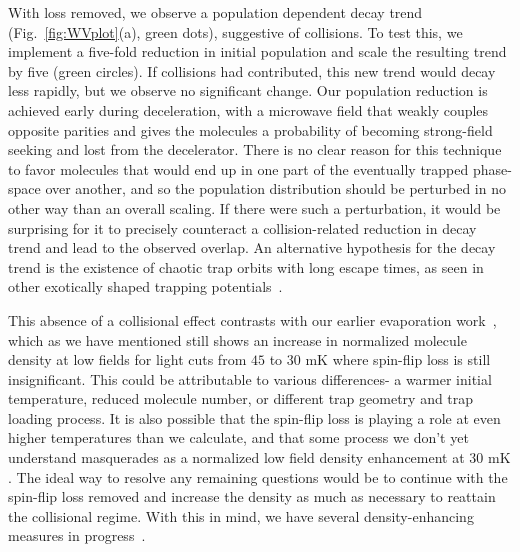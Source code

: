 \documentclass[%
 reprint,
groupedaddress,
 amsmath,amssymb,
 aps,
prl,
]{revtex4-1}
\begin{document}
With loss removed, we observe a population dependent decay trend (Fig.~\ref{fig:WVplot}(a), green dots), suggestive of collisions. To test this, we implement a five-fold reduction in initial population and scale the resulting trend by five (green circles). If collisions had contributed, this new trend would decay less rapidly, but we observe no significant change. Our population reduction is achieved early during deceleration, with a microwave field that weakly couples opposite parities and gives the molecules a probability of becoming strong-field seeking and lost from the decelerator. There is no clear reason for this technique to favor molecules that would end up in one part of the eventually trapped phase-space over another, and so the population distribution should be perturbed in no other way than an overall scaling. If there were such a perturbation, it would be surprising for it to precisely counteract a collision-related reduction in decay trend and lead to the observed overlap. An alternative hypothesis for the decay trend is the existence of chaotic trap orbits with long escape times, as seen in other exotically shaped trapping potentials~\cite{Gonzalez-Ferez2014}.

This absence of a collisional effect contrasts with our earlier evaporation work~\cite{Stuhl2012evap}, which as we have mentioned still shows an increase in normalized molecule density at low fields for light cuts from $45$ to $30\text{ mK}$ where spin-flip loss is still insignificant. This could be attributable to various differences- a warmer initial temperature, reduced molecule number, or different trap geometry and trap loading process. It is also possible that the spin-flip loss is playing a role at even higher temperatures than we calculate, and that some process we don't yet understand masquerades as a normalized low field density enhancement at $30\text{ mK}$. The ideal way to resolve any remaining questions would be to continue with the spin-flip loss removed and increase the density as much as necessary to reattain the collisional regime. With this in mind, we have several density-enhancing measures in progress~\cite{}.

\end{document}
